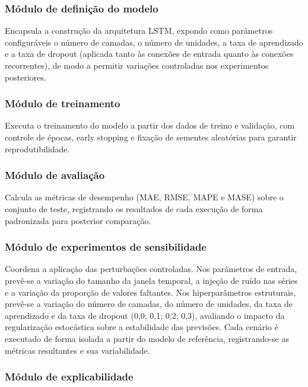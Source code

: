 \documentclass[
    12pt,                %
    openright,           %
    oneside,             %
    a4paper,             %
    english,             %
    brazil               %
]{abntex2}
\begin{document}
\subsubsection{Módulo de definição do modelo}

Encapsula a construção da arquitetura LSTM, expondo como parâmetros configuráveis o número de camadas, o número de unidades, a taxa de aprendizado e a taxa de dropout (aplicada tanto às conexões de entrada quanto às conexões recorrentes), de modo a permitir variações controladas nos experimentos posteriores.

\subsubsection{Módulo de treinamento}

Executa o treinamento do modelo a partir dos dados de treino e validação, com controle de épocas, early stopping e fixação de sementes aleatórias para garantir reprodutibilidade.

\subsubsection{Módulo de avaliação}

Calcula as métricas de desempenho (MAE, RMSE, MAPE e MASE) sobre o conjunto de teste, registrando os resultados de cada execução de forma padronizada para posterior comparação.

\subsubsection{Módulo de experimentos de sensibilidade}

Coordena a aplicação das perturbações controladas. Nos parâmetros de entrada, prevê-se a variação do tamanho da janela temporal, a injeção de ruído nas séries e a variação da proporção de valores faltantes. Nos hiperparâmetros estruturais, prevê-se a variação do número de camadas, do número de unidades, da taxa de aprendizado e da taxa de dropout (0,0; 0,1; 0,2; 0,3), avaliando o impacto da regularização estocástica sobre a estabilidade das previsões. Cada cenário é executado de forma isolada a partir do modelo de referência, registrando-se as métricas resultantes e sua variabilidade.

\subsubsection{Módulo de explicabilidade}
\end{document}
